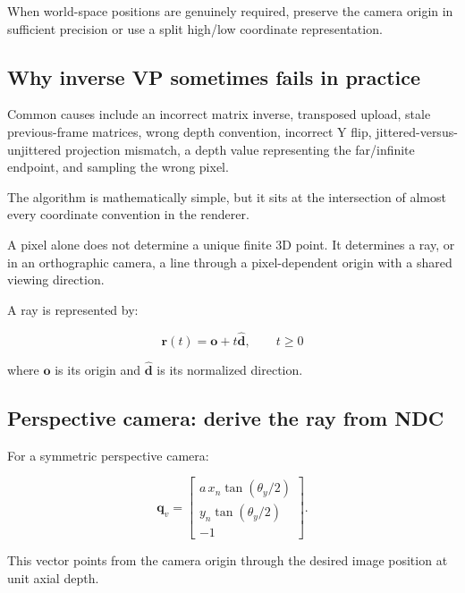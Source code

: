 When world-space positions are genuinely required, preserve the camera origin in sufficient precision or use a split high/low coordinate representation.

\subsection{Why inverse VP sometimes fails in practice}\label{02-foundations-ii-ch035-why-inverse-vp-sometimes-fails-in-practice}

\hypertarget{02-foundations-ii-ch035-why-inverse-vp-sometimes-fails-in-practice}{}

Common causes include an incorrect matrix inverse, transposed upload, stale previous-frame matrices, wrong depth convention, incorrect Y flip, jittered-versus-unjittered projection mismatch, a depth value representing the far/infinite endpoint, and sampling the wrong pixel.

The algorithm is mathematically simple, but it sits at the intersection of almost every coordinate convention in the renderer.

A pixel alone does not determine a unique finite 3D point. It determines a ray, or in an orthographic camera, a line through a pixel-dependent origin with a shared viewing direction.

A ray is represented by:

\[ \boxed{ \mathbf r(t)=\mathbf o+t\hat{\mathbf d}, \qquad t\ge0 } \]

where \(\mathbf o\) is its origin and \(\hat{\mathbf d}\) is its normalized direction.

\subsection{Perspective camera: derive the ray from NDC}\label{02-foundations-ii-ch035-perspective-camera-derive-the-ray-from-ndc}

\hypertarget{02-foundations-ii-ch035-perspective-camera-derive-the-ray-from-ndc}{}

For a symmetric perspective camera:

\[ \mathbf q_v= \begin{bmatrix} a\,x_n\tan(\theta_y/2)\\ y_n\tan(\theta_y/2)\\ -1 \end{bmatrix}. \]

This vector points from the camera origin through the desired image position at unit axial depth.

